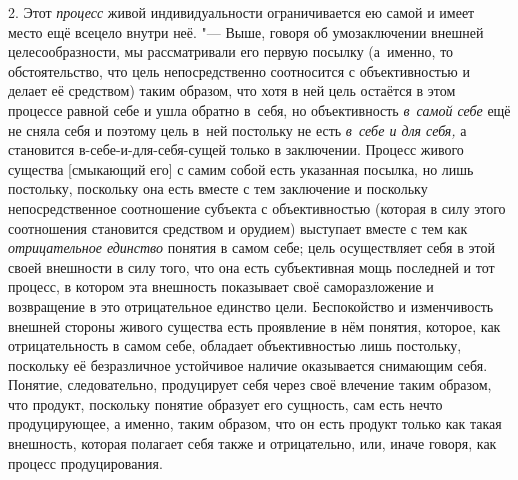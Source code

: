2. Этот {\em процесс} живой индивидуальности ограничивается ею самой и
имеет место ещё всецело внутри неё. "--- Выше, говоря об умозаключении
внешней целесообразности, мы рассматривали его первую посылку (а~именно, то
обстоятельство, что цель непосредственно соотносится с объективностью и
делает её средством) таким образом, что хотя в ней цель остаётся в этом
процессе равной себе и ушла обратно в~себя, но объективность
{\em в~самой себе} ещё не сняла себя и поэтому цель в~ней постольку не есть
{\em в~себе и для себя,}
а становится в-себе-и-для-себя-сущей только в заключении.
Процесс живого существа [смыкающий его] с самим собой есть указанная
посылка, но лишь постольку, поскольку она есть вместе с тем заключение и
поскольку непосредственное соотношение субъекта с объективностью (которая в
силу этого соотношения становится средством и орудием) выступает вместе с
тем как {\em отрицательное единство}
понятия в самом себе; цель осуществляет себя в этой своей
внешности в силу того, что она есть субъективная мощь последней и тот
процесс, в котором эта внешность показывает своё саморазложение
и возвращение в это отрицательное единство цели.
Беспокойство и изменчивость внешней стороны живого существа есть проявление
в нём понятия, которое, как отрицательность в самом себе, обладает
объективностью лишь постольку, поскольку её безразличное устойчивое наличие
оказывается снимающим себя. Понятие, следовательно, продуцирует себя через
своё влечение таким образом, что продукт, поскольку понятие образует его
сущность, сам есть нечто продуцирующее, а именно, таким образом, что он
есть продукт только как такая внешность, которая полагает себя также и
отрицательно, или, иначе говоря, как процесс продуцирования.

